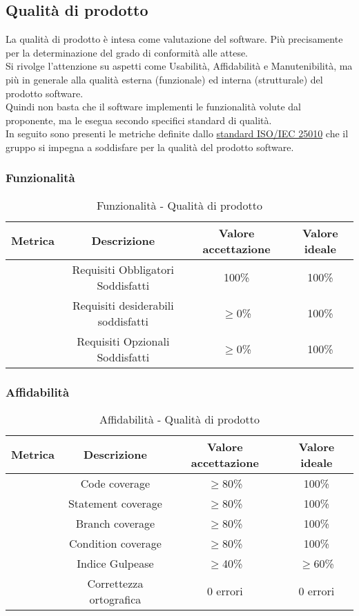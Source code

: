 \documentclass[11pt]{article}
\begin{document}
\begin{justify}
\subsection{Qualità di prodotto}\label{qpd}
La qualità di prodotto è intesa come valutazione del software. Più precisamente per la determinazione del grado di conformità alle attese.\\
Si rivolge l'attenzione su aspetti come Usabilità, Affidabilità e Manutenibilità, ma più in generale alla qualità esterna (funzionale) ed interna (strutturale) del prodotto software.\\
Quindi non basta che il software implementi le funzionalità volute dal proponente, ma le esegua secondo specifici standard di qualità.\\
In seguito sono presenti le metriche definite dallo \hyperref[ISO 9126 25010]{standard ISO/IEC 25010} che il gruppo si impegna a soddisfare per la qualità del prodotto software.
\subsubsection{Funzionalità}
\begin{table}[H]
  \centering
\begin{tabular}{|c|c|c|c|}
  \hline
  \textbf{Metrica} & \textbf{Descrizione} & \textbf{Valore accettazione} & \textbf{Valore ideale}\\
  \hline
  & Requisiti Obbligatori Soddisfatti & 100\% & 100\%\\
  \hline
  & Requisiti desiderabili soddisfatti  & $\geq$0\% & 100\% \\
  \hline
  & Requisiti Opzionali Soddisfatti & $\geq$0\% & 100\% \\
  \hline
\end{tabular}
\caption{Funzionalità - Qualità di prodotto}
\label{tab:funzionalità}
\end{table}

\subsubsection{Affidabilità}
\begin{table}[H]
  \centering
\begin{tabular}{|c|c|c|c|}
  \hline
  \textbf{Metrica} & \textbf{Descrizione} & \textbf{Valore accettazione} & \textbf{Valore ideale}\\
  \hline
  & Code coverage & $\geq$80\% & 100\% \\
  \hline
  & Statement coverage & $\geq$80\% & 100\% \\
  \hline
  & Branch coverage & $\geq$80\% & 100\% \\
  \hline
  & Condition coverage & $\geq$80\% & 100\% \\
  \hline
  & Indice Gulpease & $\geq$40\% & $\geq$60\% \\
  \hline
  & Correttezza ortografica & 0 errori & 0 errori \\
  \hline
\end{tabular}
\caption{Affidabilità - Qualità di prodotto}
\label{tab:affidabilità}
\end{table}


\end{justify}
\end{document}

